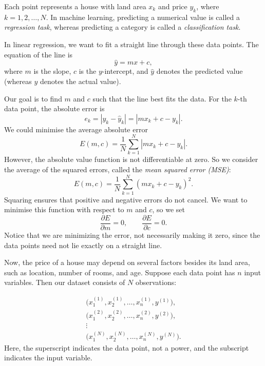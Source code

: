 Each point represents a house with land area \(x_k\) and price \(y_k\), where \(k=1,2,\ldots,N\). In machine learning, predicting a numerical value is called a \emph{regression task}, whereas predicting a category is called a \emph{classification task}.

In linear regression, we want to fit a straight line through these data points. The equation of the line is
\[
	\hat{y}=mx+c,
\]
where \(m\) is the slope, \(c\) is the \(y\)-intercept, and \(\hat{y}\) denotes the predicted value (whereas \(y\) denotes the actual value).

Our goal is to find \(m\) and \(c\) such that the line best fits the data. For the \(k\)-th data point, the absolute error is
\[
	e_k=|y_k-\hat{y}_k|=|mx_k+c-y_k|.
\]
We could minimise the average absolute error
\[
	E(m,c)=\frac{1}{N}\sum_{k=1}^{N}|mx_k+c-y_k|.
\]
However, the absolute value function is not differentiable at zero. So we consider the average of the squared errors, called the \emph{mean squared error (MSE)}:
\begin{equation}
	E(m,c)=\frac{1}{N}\sum_{k=1}^{N}(mx_k+c-y_k)^2.
	\label{eq:lecture-11-3}
\end{equation}
Squaring ensures that positive and negative errors do not cancel. We want to minimise this function with respect to \(m\) and \(c\), so we set
\[
	\frac{\partial E}{\partial m}=0,
	\qquad
	\frac{\partial E}{\partial c}=0.
\]
Notice that we are minimizing the error, not necessarily making it zero, since the data points need not lie exactly on a straight line.

Now, the price of a house may depend on several factors besides its land area, such as location, number of rooms, and age. Suppose each data point has \(n\) input variables. Then our dataset consists of \(N\) observations:

\begin{equation*}
	\begin{gathered}
		\bigl(x_1^{(1)},x_2^{(1)},\ldots,x_n^{(1)},y^{(1)}\bigr), \\
		\bigl(x_1^{(2)},x_2^{(2)},\ldots,x_n^{(2)},y^{(2)}\bigr), \\
		\vdots                                        \\
		\bigl(x_1^{(N)},x_2^{(N)},\ldots,x_n^{(N)},y^{(N)}\bigr).
	\end{gathered}
	\label{eq:linear-regression-1}
\end{equation*}
Here, the superscript indicates the data point, not a power, and the subscript indicates the input variable.

